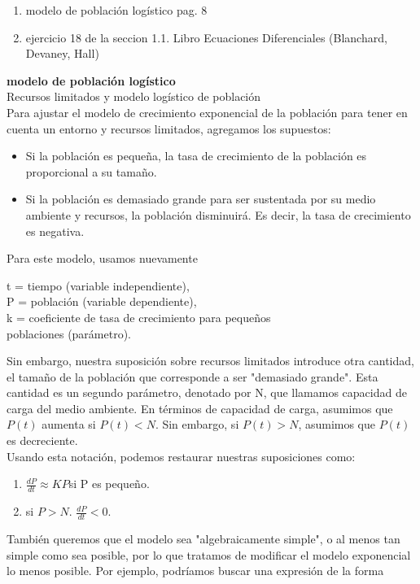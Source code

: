 \documentclass{article}
\begin{document}
\begin{enumerate}
    \item modelo de población logístico pag. 8 
    \item ejercicio 18 de la seccion 1.1. Libro Ecuaciones Diferenciales (Blanchard, Devaney, Hall)
\end{enumerate}
\textbf{modelo de población logístico} \\
Recursos limitados y modelo logístico de población\\
Para ajustar el modelo de crecimiento exponencial de la población para tener en cuenta un entorno y recursos limitados, agregamos los supuestos:
\begin{itemize}
    \item Si la población es pequeña, la tasa de crecimiento de la población es proporcional a su tamaño.
    \item Si la población es demasiado grande para ser sustentada por su medio ambiente y recursos, 
    la población disminuirá. Es decir, la tasa de crecimiento es negativa.
\end{itemize}
Para este modelo, usamos nuevamente
\begin{center}
    t = tiempo (variable independiente),\\
    P = población (variable dependiente),\\
    k = coeficiente de tasa de crecimiento para pequeños\\
    poblaciones (parámetro).
\end{center}
Sin embargo, nuestra suposición sobre recursos limitados introduce otra cantidad, 
el tamaño de la población que corresponde a ser "demasiado grande". Esta cantidad es un segundo 
parámetro, denotado por N, que llamamos capacidad de carga del medio ambiente. En términos de capacidad 
de carga, 
asumimos que $P (t)$ aumenta si $P(t) <N$. Sin embargo, si $P (t)> N$, asumimos que $P (t)$ 
es decreciente. \\ 
Usando esta notación, podemos restaurar nuestras suposiciones como:
\begin{enumerate}
    \item $\frac{dP}{dt} \approx KP $si  P es pequeño.
    \item si $P > N$. $\frac{dP}{dt}<0$.
\end{enumerate}
También queremos que el modelo sea "algebraicamente simple", o al menos tan simple como sea posible,
por lo que tratamos de modificar el modelo exponencial lo menos posible. Por ejemplo, podríamos buscar 
una expresión de la forma
\end{document}

